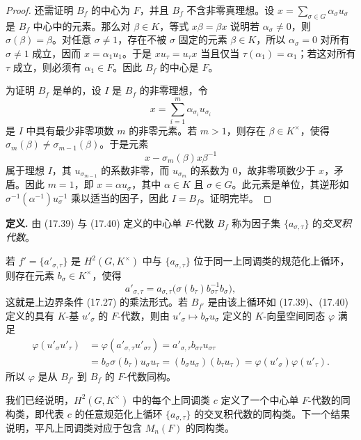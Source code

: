 \begin{proof}
还需证明 $B_f$ 的中心为 $F$，并且 $B_f$ 不含非零真理想。设 $x=\sum_{\sigma\in G}\alpha_\sigma u_\sigma$ 是 $B_f$ 中心中的元素。那么对 $\beta\in K$，等式 $x\beta=\beta x$ 说明若 $\alpha_\sigma\neq0$，则 $\sigma(\beta)=\beta$。对任意 $\sigma\neq1$，存在不被 $\sigma$ 固定的元素 $\beta\in K$，所以 $\alpha_\sigma=0$ 对所有 $\sigma\neq1$ 成立，因而 $x=\alpha_1u_1$。于是 $xu_\tau=u_\tau x$ 当且仅当 $\tau(\alpha_1)=\alpha_1$；若这对所有 $\tau$ 成立，则必须有 $\alpha_1\in F$。因此 $B_f$ 的中心是 $F$。

为证明 $B_f$ 是单的，设 $I$ 是 $B_f$ 的非零理想，令
\[
  x=\sum_{i=1}^m\alpha_{\sigma_i}u_{\sigma_i}
\]
是 $I$ 中具有最少非零项数 $m$ 的非零元素。若 $m>1$，则存在 $\beta\in K^\times$，使得 $\sigma_m(\beta)\neq\sigma_{m-1}(\beta)$。于是元素
\[
  x-\sigma_m(\beta)x\beta^{-1}
\]
属于理想 $I$，其 $u_{\sigma_{m-1}}$ 的系数非零，而 $u_{\sigma_m}$ 的系数为 $0$，故非零项数少于 $x$，矛盾。因此 $m=1$，即 $x=\alpha u_\sigma$，其中 $\alpha\in K$ 且 $\sigma\in G$。此元素是单位，其逆形如 $\sigma^{-1}(\alpha^{-1})u_\sigma^{-1}$ 乘以适当的因子，因此 $I=B_f$。证明完毕。
\end{proof}

\noindent\textbf{定义.} 由 (17.39) 与 (17.40) 定义的中心单 $F$-代数 $B_f$ 称为因子集 $\{a_{\sigma,\tau}\}$ 的\emph{交叉积代数}。

若 $f'=\{a'_{\sigma,\tau}\}$ 是 $H^2(G,K^\times)$ 中与 $\{a_{\sigma,\tau}\}$ 位于同一上同调类的规范化上循环，则存在元素 $b_\sigma\in K^\times$，使得
\[
  a'_{\sigma,\tau}=a_{\sigma,\tau}\bigl(\sigma(b_\tau)b_{\sigma\tau}^{-1}b_\sigma\bigr),
\]
这就是上边界条件 (17.27) 的乘法形式。若 $B_{f'}$ 是由该上循环如 (17.39)、(17.40) 定义的具有 $K$-基 $u'_{\sigma}$ 的 $F$-代数，则由 $u'_{\sigma}\mapsto b_\sigma u_\sigma$ 定义的 $K$-向量空间同态 $\varphi$ 满足
\[
\begin{aligned}
  \varphi(u'_{\sigma}u'_{\tau})
  &=\varphi(a'_{\sigma,\tau}u'_{\sigma\tau})
    =a'_{\sigma,\tau}b_{\sigma\tau}u_{\sigma\tau}\\
  &=b_\sigma\sigma(b_\tau)u_\sigma u_\tau
    =(b_\sigma u_\sigma)(b_\tau u_\tau)
    =\varphi(u'_{\sigma})\varphi(u'_{\tau}).
\end{aligned}
\]
所以 $\varphi$ 是从 $B_{f'}$ 到 $B_f$ 的 $F$-代数同构。

我们已经说明，$H^2(G,K^\times)$ 中的每个上同调类 $c$ 定义了一个中心单 $F$-代数的同构类，即代表 $c$ 的任意规范化上循环 $\{a_{\sigma,\tau}\}$ 的交叉积代数的同构类。下一个结果说明，平凡上同调类对应于包含 $M_n(F)$ 的同构类。

